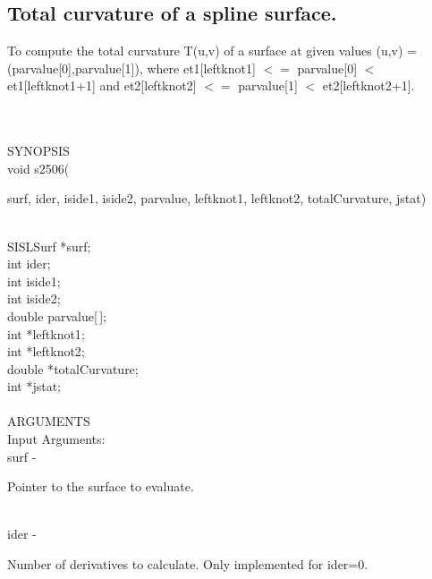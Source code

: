 \subsection{Total curvature of a spline surface.}
\begin{minipg1}
To compute the total curvature T(u,v) of a surface at
                   given values (u,v) = (parvalue[0],parvalue[1]), where
                   et1[leftknot1] $<=$ parvalue[0] $<$ et1[leftknot1+1] and
                   et2[leftknot2] $<=$ parvalue[1] $<$ et2[leftknot2+1].
\end{minipg1} \\ \\
SYNOPSIS\\
        \>  void s2506(\begin{minipg3}
            {\fov surf},  {\fov ider},  {\fov iside1},  {\fov iside2},  {\fov parvalue},  {\fov leftknot1},  {\fov leftknot2},
	     {\fov totalCurvature},  {\fov jstat})
                \end{minipg3}\\
                \>\>    SISLSurf \> *{\fov surf};\\
                \>\>    int    \>  {\fov ider};\\
                \>\>    int    \>  {\fov iside1};\\
                \>\>    int    \>  {\fov iside2};\\
                \>\>    double \> {\fov parvalue}[\,];\\
                \>\>    int \> *{\fov leftknot1};\\
                \>\>    int \> *{\fov leftknot2};\\
                \>\>    double \> *{\fov totalCurvature};\\
                \>\>    int \> *{\fov jstat};\\
\\
ARGUMENTS\\
	\>Input Arguments:\\
        \>\>    {\fov surf}\> - \>  \begin{minipg2}
                     Pointer to the surface to evaluate.
                               \end{minipg2}\\[0.8ex]
        \>\>    {\fov ider}\> - \>  \begin{minipg2}
                     Number of derivatives to calculate.
                     Only implemented for ider=0.
                               \end{minipg2}\\[0.8ex]

